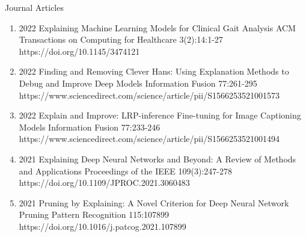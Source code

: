 \documentclass[10pt,a4paper]{article} %
\begin{document}
\headedsection %
{Journal Articles}{ }
{
\begin{enumerate}

    \item[] 
                        {2022}
                        {Explaining Machine Learning Models for Clinical Gait Analysis}
                        {ACM Transactions on Computing for Healthcare}
                        {3(2):14:1-27}
                        {https://doi.org/10.1145/3474121}


    \item[] 
                        {2022}
                        {Finding and Removing Clever Hans: Using Explanation Methods to Debug and Improve Deep Models}
                        {Information Fusion}
                        {77:261-295}
                        {https://www.sciencedirect.com/science/article/pii/S1566253521001573}


    \item[] 
                       {2022}
                       {Explain and Improve: LRP-inference Fine-tuning for Image Captioning Models}
                       {Information Fusion}
                       {77:233-246}
                       {https://www.sciencedirect.com/science/article/pii/S1566253521001494}

    \item[] 
                        {2021}
                        {Explaining Deep Neural Networks and Beyond: A Review of Methods and Applications}
                        {Proceedings of the IEEE}
                        {109(3):247-278}
                        {https://doi.org/10.1109/JPROC.2021.3060483}

    \item[] 
                        {2021}
                        {Pruning by Explaining: A Novel Criterion for Deep Neural Network Pruning}
                        {Pattern Recognition}
                        {115:107899}
                        {https://doi.org/10.1016/j.patcog.2021.107899}


\end{enumerate}}
\end{document}
